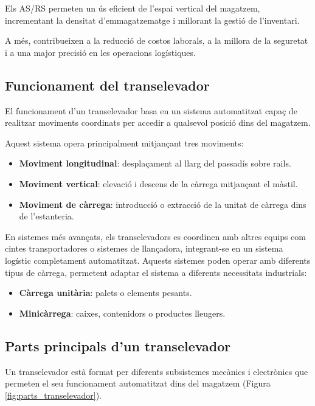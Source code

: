 \documentclass[a4paper,11pt,DIV=13,headings=normal,abstract=true,twoside=semi]{article}
\begin{document}
Els AS/RS permeten un ús eficient de l'espai vertical del magatzem, incrementant la densitat d'emmagatzematge i millorant la gestió de l'inventari.

A més, contribueixen a la reducció de costos laborals, a la millora de la seguretat i a una major precisió en les operacions logístiques.



\subsection{Funcionament del transelevador}

El funcionament d'un transelevador \cite{transelevador_info} basa en un sistema automatitzat capaç de realitzar moviments coordinats per accedir a qualsevol posició dins del magatzem.

Aquest sistema opera principalment mitjançant tres moviments:

\begin{itemize}
    \item \textbf{Moviment longitudinal}: desplaçament al llarg del passadís sobre rails.
    \item \textbf{Moviment vertical}: elevació i descens de la càrrega mitjançant el màstil.
    \item \textbf{Moviment de càrrega}: introducció o extracció de la unitat de càrrega dins de l'estanteria.
\end{itemize}


En sistemes més avançats, els transelevadors es coordinen amb altres equips com cintes transportadores o sistemes de llançadora, integrant-se en un sistema logístic completament automatitzat. Aquests sistemes poden operar amb diferents tipus de càrrega, permetent adaptar el sistema a diferents necessitats industrials:

\begin{itemize}
    \item \textbf{Càrrega unitària}: palets o elements pesants.
    \item \textbf{Minicàrrega}: caixes, contenidors o productes lleugers.
\end{itemize}

\subsection{Parts principals d'un transelevador}

Un transelevador està format per diferents subsistemes mecànics i electrònics que permeten el seu funcionament automatitzat dins del magatzem (Figura \ref{fig:parts_transelevador}).
\end{document}
